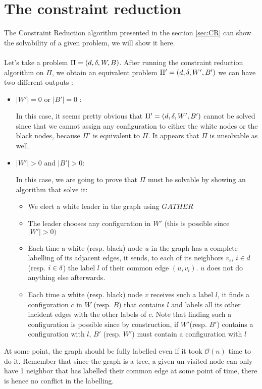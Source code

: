 \section{The constraint reduction}
The Constraint Reduction algorithm presented in the section \ref{sec:CR} can show the solvability of a given problem, we will show it here.\\\\
Let's take a problem $\Pi = (d,\delta,W,B)$. After running the constraint reduction algorithm on $\Pi$, we obtain an equivalent problem $\Pi' = (d,\delta,W',B')$ we can have two different outputs :
\begin{itemize}
    \item $|W'| = 0$ or $|B'| = 0$ :
    
    In this case, it seems pretty obvious that $\Pi' = (d,\delta,W',B')$ cannot be solved since that we cannot assign any configuration to either the white nodes or the black nodes, because $\Pi'$ is equivalent to $\Pi$. It appears that $\Pi$ is unsolvable as well.
    \item  $|W'| > 0$ and $|B'| > 0$:
    
    In this case, we are going to prove that $\Pi$ must be solvable by showing an algorithm that solve it:
    \begin{itemize}
        \item We elect a white leader in the graph using $GATHER$
        \item The leader chooses any configuration in $W'$ (this is possible since $|W'|>0)$
        \item Each time a white (resp. black) node $u$ in the graph has a complete labelling of its adjacent edges, it sends, to each of its neighbors $v_i$, $i\in d$ (resp. $i\in\delta$) the label $l$ of their common edge $(u,v_i)$. $u$ does not do anything else afterwards.
        \item Each time a white (resp. black) node $v$ receives such a label $l$, it finds a configuration $c$ in $W$ (resp. $B$) that contains $l$ and labels all its other incident edges with the other labels of $c$. Note that finding such a configuration is possible since by construction, if $W'$(resp. $B'$) contains a configuration with $l$, $B'$ (resp. $W'$) must contain a configuration with $l$
    \end{itemize}
\end{itemize}

At some point, the graph should be fully labelled even if it took $\mathcal{O}(n)$ time to do it. Remember that since the graph is a tree, a given un-visited node can only have 1 neighbor that has labelled their common edge at some point of time, there is hence no conflict in the labelling.

